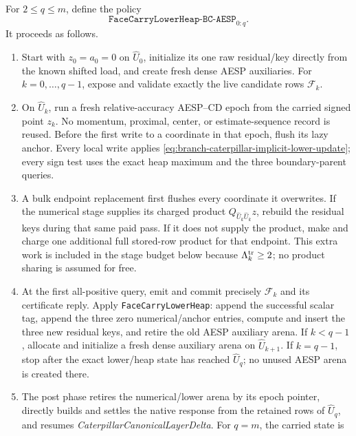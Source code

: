 \begin{definition}
\label{def:branch-caterpillar-incremental-face-policy}
For $2\leq q\leq m$, define the policy
\[
 \texttt{FaceCarryLowerHeap-BC-AESP}_{0:q}.
\]
It proceeds as follows.
\begin{enumerate}
 \item Start with $z_0=a_0=0$ on $\widehat U_0$, initialize its one raw
       residual/key directly from the known shifted load, and create fresh
       dense AESP auxiliaries.  For $k=0,\ldots,q-1$, expose and validate
       exactly the live candidate rows $\mathcal F_k$.
 \item On $\widehat U_k$, run a fresh relative-accuracy AESP--CD epoch from
       the carried signed point $z_k$.  No momentum, proximal, center, or
       estimate-sequence record is reused.  Before the first write to a
       coordinate in that epoch, flush its lazy anchor.  Every local write
       applies
       \cref{eq:branch-caterpillar-implicit-lower-update}; every sign test
       uses the exact heap maximum and the three boundary-parent queries.
 \item A bulk endpoint replacement first flushes every coordinate it
       overwrites.  If the numerical stage supplies its charged product
       $Q_{\widehat U_k\widehat U_k}z$, rebuild the residual keys during that
       same paid pass.  If it does not supply the product, make and charge one
       additional full stored-row product for that endpoint.  This extra work
       is included in the stage budget below because
       $\Lambda_k^{\rm tr}\geq2$; no product sharing is assumed for free.
 \item At the first all-positive query, emit and commit precisely
       $\mathcal F_k$ and its certificate reply.  Apply
       \texttt{FaceCarryLowerHeap}: append the successful scalar tag, append
       the three zero numerical/anchor entries, compute and insert the three
       new residual keys, and retire the old AESP auxiliary arena.  If
       $k<q-1$, allocate and initialize a fresh dense auxiliary arena on
       $\widehat U_{k+1}$.  If $k=q-1$, stop after the exact lower/heap state
       has reached $\widehat U_q$; no unused AESP arena is created there.
 \item The post phase retires the numerical/lower arena by its epoch pointer,
       directly builds and settles the native response from the retained rows
       of $\widehat U_q$, and resumes
       \emph{CaterpillarCanonicalLayerDelta}.  For $q=m$, the carried state is

\end{enumerate}
\end{definition}
